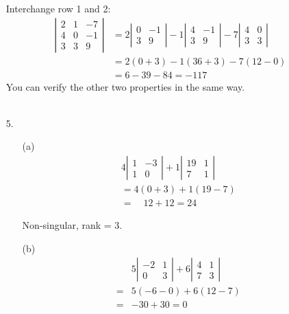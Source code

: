 \documentclass{./../../Latex/homework}
\begin{document}
\begin{enumerate}
Interchange row 1 and 2:
$$
\begin{aligned}
\left|\begin{array}{rrr}
2 & 1 & -7 \\
4 & 0 & -1 \\
3 & 3 & 9
\end{array}\right| &=2\left|\begin{array}{rr}
0 & -1 \\
3 & 9
\end{array}\right|-1\left|\begin{array}{cc}
4 & -1 \\
3 & 9
\end{array}\right|-7\left|\begin{array}{ll}
4 & 0 \\
3 & 3
\end{array}\right| \\
&=2(0+3)-1(36+3)-7(12-0) \\
&=6-39-84=-117
\end{aligned}
$$
You can verify the other two properties in the same way. \\~\\

\item[5.] 
\begin{enumerate}
\item[(a)] $$
\begin{array}{l}
4\left|\begin{array}{cc}
1 & -3 \\
1 & 0
\end{array}\right|+1\left|\begin{array}{cc}
19 & 1 \\
7 & 1
\end{array}\right| \\
=4(0+3)+1(19-7) \\
=\quad 12+12=24
\end{array}
$$

Non-singular, rank = 3. \\

\item[(b)] $$
\begin{aligned}
& 5\left|\begin{array}{cc}
-2 & 1 \\
0 & 3
\end{array}\right|+6 \left| \begin{array}{ll}
4 & 1 \\
7 & 3
\end{array}\right| \\
=& 5(-6-0)+6(12-7) \\
=&-30+30=0
\end{aligned}
$$


\end{enumerate}
\end{enumerate}
\end{document}
